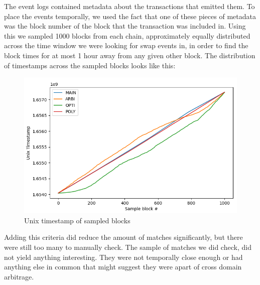The event logs contained metadata about the transactions that emitted them. To place the events temporally, we used the fact that one of these pieces of metadata was the block number of the block that the transaction was included in. Using this we sampled 1000 blocks from each chain, approximately equally distributed across the time window we were looking for swap events in, in order to find the block times for at most 1 hour away from any given other block. The distribution of timestamps across the sampled blocks looks like this: 
\begin{figure}[H]
    \centering
    \includegraphics[width=\textwidth]{3_FIGURES/Results/sampleblocktimes.PNG}
    \caption{Unix timestamp of sampled blocks}
    \label{unixtime}
\end{figure}

Adding this criteria did reduce the amount of matches significantly, but there were still too many to manually check. The sample of matches we did check, did not yield anything interesting. They were not temporally close enough or had anything else in common that might suggest they were apart of cross domain arbitrage.





